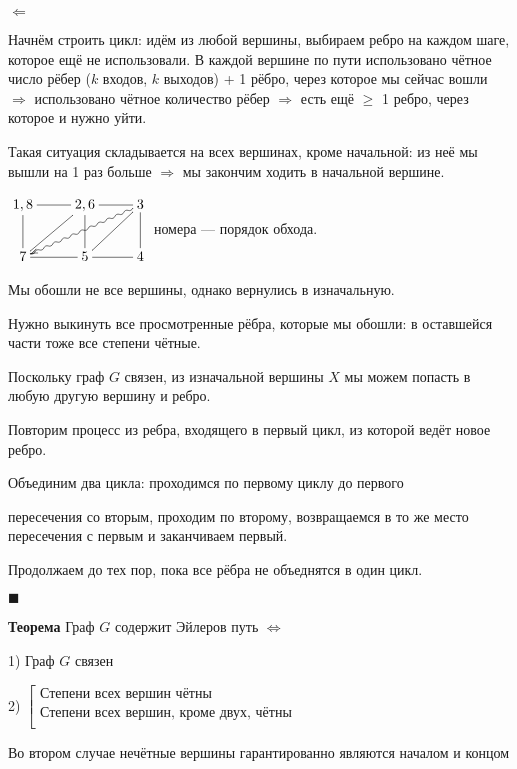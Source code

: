 \documentclass[a4paper, 12pt] {article}
\begin{document}
$ \Leftarrow $ 

Начнём строить цикл: идём из любой вершины, выбираем ребро на каждом шаге,  которое ещё не использовали. В каждой вершине по пути использовано чётное число рёбер ($ k $ входов, $ k $ выходов) + 1 рёбро, через которое мы сейчас вошли $ \Rightarrow $  использовано чётное количество рёбер $ \Rightarrow $  есть ещё $ \ge $ 1 ребро, через которое и нужно уйти.

Такая ситуация складывается на всех вершинах, кроме начальной: из неё мы вышли на 1 раз больше $ \Rightarrow $ мы закончим ходить в начальной вершине.

$ \begin{matrix}
	\xymatrix{
		1, 8 \ar@{-}[d] \ar@{-}[r] & 2, 6 \ar@{-}[ld] \ar@{-}[d] & 3 \ar@{~>}[dll] \ar@{-}[dl] \ar@{-}[l]\\
		7 \ar@{-}[r] & 5 & 4 \ar@{-}[u] \ar@{-}[l] \\
	}
\end{matrix} $ номера --- порядок обхода.

Мы обошли не все вершины, однако вернулись в изначальную.

Нужно выкинуть все просмотренные рёбра, которые мы обошли: в оставшейся части тоже все степени чётные.

Поскольку граф $ G $ связен, из изначальной вершины $ X $ мы можем попасть в любую другую вершину и ребро.

Повторим процесс из ребра, входящего в первый цикл, из которой ведёт новое ребро.

Объединим два цикла: проходимся по первому циклу до первого

 пересечения со вторым, проходим по второму, возвращаемся в то же место пересечения с первым и заканчиваем первый.

Продолжаем до тех пор, пока все рёбра не объеднятся в один цикл.

$ \blacksquare $

\textbf{Теорема} Граф $ G $ содержит Эйлеров путь $ \Leftrightarrow $ 

1) Граф $ G $ связен

2) $ \left[
\begin{array}{ccc}
	\text{Степени всех вершин чётны} \\
	\text{Степени всех вершин, кроме двух, чётны} \\
\end{array}
\right. $

Во втором случае нечётные вершины гарантированно являются началом и концом
\end{document}
